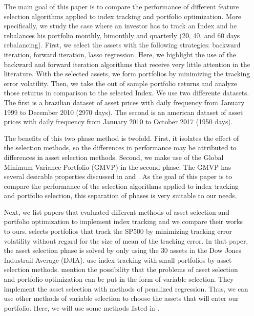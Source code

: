 \documentclass[preprint, doubleblind, authoryear,10pt]{elsarticle}
\begin{document}

The main goal of this paper is to compare the performance of different feature selection algorithms applied to index tracking and portfolio optimization.
More specifically, we study the case where an investor has to track an Index and he rebalances his portfolio monthly, bimonthly and quarterly (20, 40, and 60 days rebalancing).
First, we select the assets with the following strategies:
backward iteration, forward iteration, lasso regression.
Here, we highlight the use of the backward and forward iteration algorithms that receive very little attention in the literature.
With the selected assets, we form portfolios by minimizing the tracking error volatility.
Then, we take the out of sample portfolio returns and analyze those returns in comparison to the selected Index.
We use two differente datasets.
The first is a brazilian dataset of asset prices with daily frequency from January 1999 to December 2010 (2970 days).
The second is an american dataset of asset prices with daily frequency from January 2010 to October 2017 (1950 days).

The benefits of this two phase method is twofold.
First, it isolates the effect of the selection methods, so the differences in performance may be attributed to differences in asset selection methods.
Second, we make use of the Global Minimum Variance Portfolio (GMVP) in the second phase.
The GMVP has several desirable properties discussed in \cite{jag-2003} and \cite{CTS2006}.
As the goal of this paper is to compare the performance of the selection algorithms applied to index tracking and portfolio selection, this separation of phases is very suitable to our needs.


Next, we list papers that evaluated different methods of asset selection and portfolio optimization to implement index tracking and we compare their works to ours.
%
\cite{liu-2009} selects portfolios that track the SP500 by minimizing tracking error volatility without regard for the size of mean of the tracking error.
In that paper, the asset selection phase is solved by only using the 30 assets in the Dow Jones Industrail Average (DJIA).
\cite{dijk2002} use index tracking with small portfolios by asset selection methods.
\cite{PLS10} mention the possibility that the problems of asset selection and portfolio optimization can be put in the form of variable selection.
They implement the asset selection with methods of penalized regression.
Thus, we can use other methods of variable selection to choose the assets that will enter our portfolio.
Here, we will use some methods listed in \cite{isl-2014}.
\end{document}
